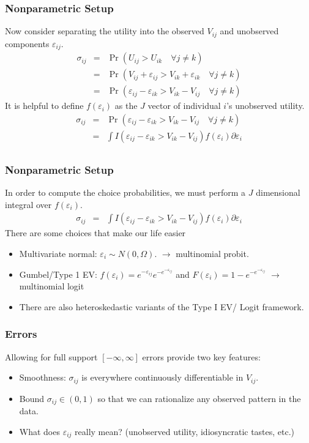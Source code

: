 \documentclass[aspectratio=169,11pt]{beamer}
\begin{document}
\begin{frame}
\frametitle{Nonparametric Setup}
Now consider separating the utility into the observed $V_{ij}$ and unobserved components $\varepsilon_{ij}$.
\begin{eqnarray*}
\sigma_{ij} &=& \Pr( U_{ij} > U_{ik} \quad \forall j \neq k)\\
 &=& \Pr( V_{ij} + \varepsilon_{ij} > V_{ik} + \varepsilon_{ik} \quad \forall j \neq k)\\
 &=& \Pr( \varepsilon_{ij}-\varepsilon_{ik} > V_{ik} - V_{ij} \quad \forall j \neq k)
\end{eqnarray*}
\pause
It is helpful to define $f(\varepsilon_{i})$ as the $J$ vector of individual $i$'s unobserved utility.
\begin{eqnarray*}
\sigma_{ij} &=& \Pr( \varepsilon_{ij}-\varepsilon_{ik} > V_{ik} - V_{ij} \quad \forall j \neq k)\\
&=& \int I( \varepsilon_{ij}-\varepsilon_{ik} > V_{ik} - V_{ij} ) f( \varepsilon_i) \partial \varepsilon_i \\
\end{eqnarray*}
\end{frame}

\begin{frame}
\frametitle{Nonparametric Setup}
In order to compute the choice probabilities, we must perform a $J$ dimensional integral over $f(\varepsilon_i)$.
\begin{eqnarray*}
\sigma_{ij} &=&  \int I( \varepsilon_{ij}-\varepsilon_{ik} > V_{ik} - V_{ij} ) f( \varepsilon_i) \partial \varepsilon_i 
\end{eqnarray*}
There are some choices that make our life easier
\begin{itemize}
\item Multivariate normal: $\varepsilon_i  \sim N(0,\Omega)$. $\longrightarrow$ \alert{ multinomial probit}.
\item Gumbel/Type 1 EV: $f(\varepsilon_i) = e^{-\varepsilon_{ij}}  e^{-e^{-\varepsilon_{ij}}}  $ and $F(\varepsilon_i) = 1- e^{-e^{-\varepsilon_{ij}}}$ $\longrightarrow$ \alert{multinomial logit}
\item There are also heteroskedastic variants of the Type I EV/ Logit framework.
\end{itemize}
\end{frame}

\begin{frame}
\frametitle{Errors}
Allowing for full support $[-\infty, \infty]$ errors provide two key features:
\begin{itemize}
\item Smoothness: $\sigma_{ij}$ is everywhere continuously differentiable in $V_{ij}$.
\item Bound $\sigma_{ij} \in (0,1)$ so that we can rationalize any observed pattern in the data.
\item What does $\varepsilon_{ij}$ really mean? (unobserved utility, idiosyncratic tastes, etc.)
\end{itemize}
\end{frame}
\end{document}
